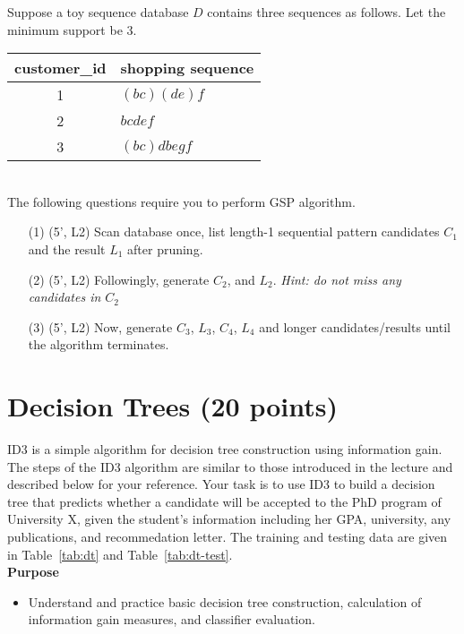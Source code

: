 Suppose a toy sequence database $D$ contains three sequences as follows. Let the minimum support be 3.

 \begin{tabular}{c|l}
 customer\_id & shopping sequence \\\hline
  1 & $(bc) (de) f$ \\
  2 & $ bc d ef$ \\
  3 & $(bc) d b e g f$ \\\hline
 \end{tabular}\\

The following questions require you to perform GSP algorithm.

\begin{enumerate}
\item [(1)] (5', L2) Scan database once, list length-1 sequential pattern candidates $C_1$ and the result $L_1$ after pruning. 
\item [(2)] (5', L2) Followingly, generate $C_2$, and $L_2$. \textit{Hint: do not miss any candidates in $C_2$}
\item [(3)] (5', L2) Now, generate $C_3$, $L_3$, $C_4$, $L_4$ and longer candidates/results until the algorithm terminates.
\end{enumerate}


\section{Decision Trees (20 points)}
ID3 is a simple algorithm for decision tree construction using information gain. The steps of the ID3 algorithm are similar to those introduced in the lecture and described below for your reference. Your task is to use ID3 to build a decision tree that predicts whether a candidate will be accepted to the PhD program of University X, given the student's information including her GPA, university, any publications, and recommedation letter. The training and testing data are given in Table~\ref{tab:dt} and Table~\ref{tab:dt-test}.\\

\textbf{Purpose} 
\begin{itemize}
    \item Understand and practice basic decision tree construction, calculation of information gain measures, and classifier evaluation.
\end{itemize}


